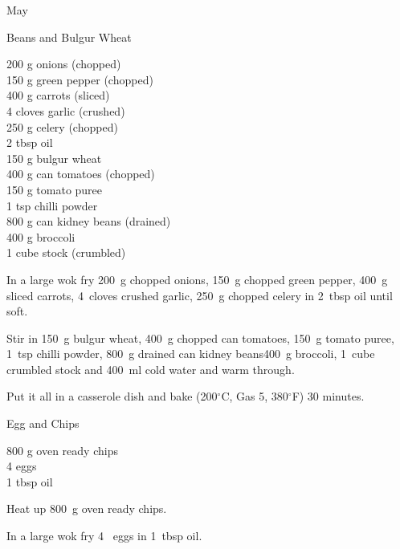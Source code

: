 \begin{menu}{May}
    \begin{recipe}{2}{Beans and Bulgur Wheat}%
		\begin{ingredients}
		200 g onions (chopped) \\
	150 g green pepper (chopped) \\
	400 g carrots (sliced) \\
	4 cloves garlic (crushed) \\
	250 g celery (chopped) \\
	2 tbsp oil  \\
	150 g bulgur wheat  \\
	400 g can tomatoes (chopped) \\
	150 g tomato puree  \\
	1 tsp chilli powder  \\
	800 g can kidney beans (drained) \\
	400 g broccoli  \\
	1 cube stock (crumbled) \\
	
		\end{ingredients}
	
    \begin{instructions}
    \item 
        In a large wok fry
        200~g chopped onions,
        150~g chopped green pepper,
        400~g sliced carrots,
        4~cloves crushed garlic,
        250~g chopped celery
        in
        2~tbsp  oil
        until soft.
      \item 
        Stir in
        150~g  bulgur wheat,
        400~g chopped can tomatoes,
        150~g  tomato puree,
        1~tsp  chilli powder,
        800~g drained can kidney beans400~g  broccoli,
        1~cube crumbled stock
        and
        400~ml  cold water
        and warm through.
      \item 
        Put it all in a casserole dish
        and bake (200$^{\circ}$C, Gas 5, 380$^{\circ}$F) 30 minutes.
      
    \end{instructions}
    \end{recipe}%
  
    \begin{recipe}{1}{Egg and Chips}%
		\begin{ingredients}
		800 g oven ready chips  \\
	4  eggs  \\
	1 tbsp oil  \\
	
		\end{ingredients}
	
    \begin{instructions}
    \item 
        Heat up
        800~g  oven ready chips.
      \item 
        In a large wok fry
        4~  eggs
        in
        1~tbsp  oil.
      
    \end{instructions}
    \end{recipe}%
  
    \clearpage
    \end{menu}
	
